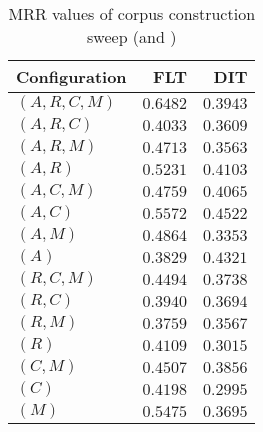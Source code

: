 
\begin{table}
\begin{spacing}{1.2}
\centering
\caption{MRR values of \tika corpus construction sweep (\cone and \ctwo)}
\label{table:tika_corpus_sweep}
\vspace{0.2em}
\begin{tabular}{lrr}
\toprule
Configuration &           FLT &           DIT \\
\midrule
  $(A,R,C,M)$ & $\bm{0.6482}$ &      $0.3943$ \\
    $(A,R,C)$ &      $0.4033$ &      $0.3609$ \\
    $(A,R,M)$ &      $0.4713$ &      $0.3563$ \\
      $(A,R)$ &      $0.5231$ &      $0.4103$ \\
    $(A,C,M)$ &      $0.4759$ &      $0.4065$ \\
      $(A,C)$ &      $0.5572$ & $\bm{0.4522}$ \\
      $(A,M)$ &      $0.4864$ &      $0.3353$ \\
        $(A)$ &      $0.3829$ &      $0.4321$ \\
    $(R,C,M)$ &      $0.4494$ &      $0.3738$ \\
      $(R,C)$ &      $0.3940$ &      $0.3694$ \\
      $(R,M)$ &      $0.3759$ &      $0.3567$ \\
        $(R)$ &      $0.4109$ &      $0.3015$ \\
      $(C,M)$ &      $0.4507$ &      $0.3856$ \\
        $(C)$ &      $0.4198$ &      $0.2995$ \\
        $(M)$ &      $0.5475$ &      $0.3695$ \\
\bottomrule
\end{tabular}

\end{spacing}
\end{table}
